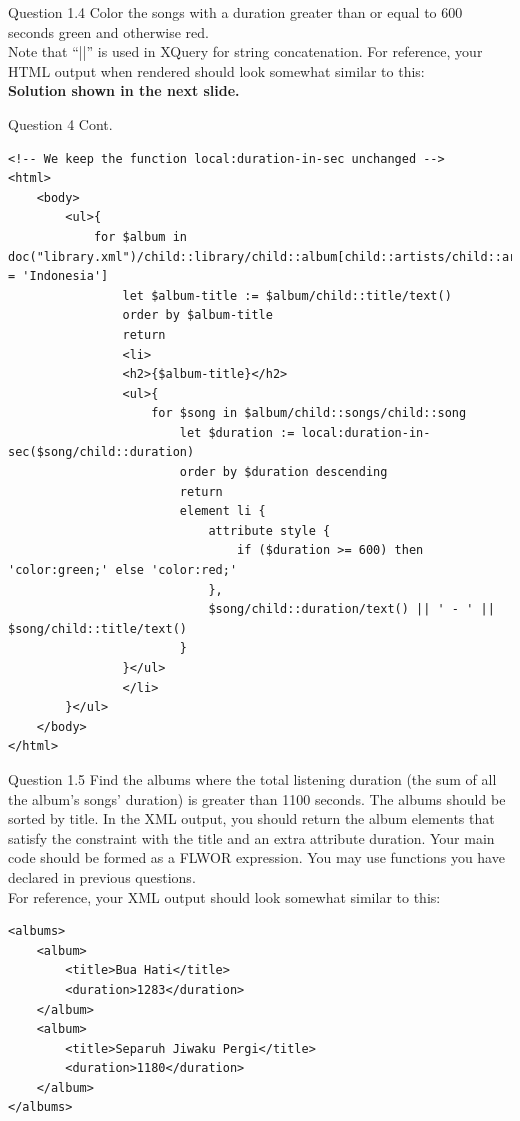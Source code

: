 \begin{frame}[fragile]{Question 1.4}
Color the songs with a duration greater than or equal to 600 seconds green and otherwise red.\\\vspace{5pt}
Note that ``||'' is used in XQuery for string concatenation. For reference, your HTML output when rendered should look somewhat similar to this: \\\vspace{15pt}
\textbf{Solution shown in the next slide.}
\end{frame}
	
\begin{frame}[fragile]{Question 4 Cont.}

\begin{lstlisting}[style=xml-small-nomargin]
<!-- We keep the function local:duration-in-sec unchanged -->
<html>
	<body>
		<ul>{
			for $album in doc("library.xml")/child::library/child::album[child::artists/child::artist/child::country = 'Indonesia']
				let $album-title := $album/child::title/text()
				order by $album-title
				return
				<li>
				<h2>{$album-title}</h2>
				<ul>{
					for $song in $album/child::songs/child::song
						let $duration := local:duration-in-sec($song/child::duration)
						order by $duration descending
						return
						element li {
							attribute style {
								if ($duration >= 600) then 'color:green;' else 'color:red;'
							},
							$song/child::duration/text() || ' - ' || $song/child::title/text()
						}
				}</ul>
				</li>
		}</ul>
	</body>
</html>
\end{lstlisting}\vspace{5pt}
\end{frame}

\begin{frame}[fragile]{Question 1.5}
Find the albums where the total listening duration (the sum of all the album's songs' duration) is greater than 1100 seconds. The albums should be sorted by title. In the XML output, you should return the album elements that satisfy the constraint with the title and an extra attribute duration. Your main code should be formed as a FLWOR expression. You may use functions you have declared in previous questions.\\\vspace{5pt}
For reference, your XML output should look somewhat similar to this:\\\vspace{5pt}

\begin{lstlisting}[style=xml-small-nomargin]
<albums>
	<album>
		<title>Bua Hati</title>
		<duration>1283</duration>
	</album>
	<album>
		<title>Separuh Jiwaku Pergi</title>
		<duration>1180</duration>
	</album>
</albums>
\end{lstlisting}\vspace{5pt}	
\end{frame}


